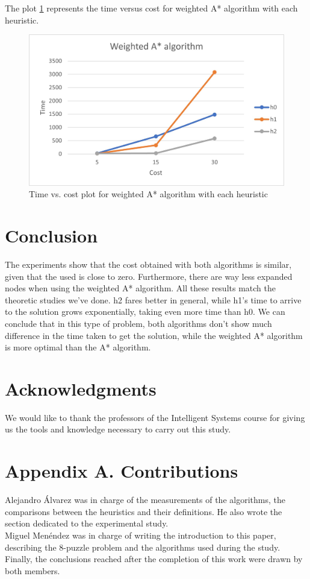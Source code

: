 \documentclass[runningheads]{llncs}
\begin{document}
The plot \ref{fig:wastar} represents the time versus cost for weighted A* algorithm with each heuristic.
\begin{figure}[H]
    \centering
    \includegraphics{WeightedAStarTimes.jpg}
    \caption{Time vs. cost plot for weighted A* algorithm with each heuristic}
    \label{fig:wastar}
\end{figure}

\section{Conclusion}
The experiments show that the cost obtained with both algorithms is similar, given that the \varepsilon  used is close to zero. Furthermore, there are way less expanded nodes when using the weighted A* algorithm. All these results match the theoretic studies we've done.
h2 fares better in general, while h1's time to arrive to the solution grows exponentially, taking even more time than h0.
We can conclude that in this type of problem, both algorithms don't show much difference in the time taken to get the solution, while the weighted A* algorithm is more optimal than the A* algorithm.
\section*{Acknowledgments}
We would like to thank the professors of the Intelligent Systems course for giving us the tools and knowledge necessary to carry out this study.
\section*{Appendix A. Contributions}
Alejandro Álvarez was in charge of the measurements of the algorithms, the comparisons between the heuristics and their definitions. He also wrote the section dedicated to the experimental study.
\\
Miguel Menéndez was in charge of writing the introduction to this paper, describing the 8-puzzle problem and the algorithms used during the study.
\\
Finally, the conclusions reached after the completion of this work were drawn by both members.
\end{document}
